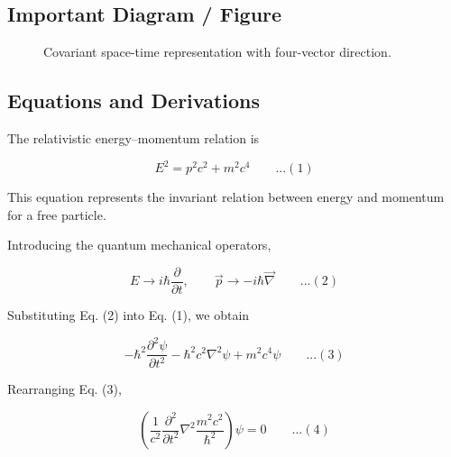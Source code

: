 \documentclass[12pt]{report}
\begin{document}
\subsection*{Important Diagram / Figure}

\begin{figure}[H]
    \centering
    \caption{Covariant space-time representation with four-vector direction.}
\end{figure}

\subsection*{Equations and Derivations}

The relativistic energy--momentum relation is

\begin{equation*}
E^2 = p^2 c^2 + m^2 c^4 \qquad ...(1)
\end{equation*}

This equation represents the invariant relation between energy and momentum for a free particle.

Introducing the quantum mechanical operators,

\begin{equation*}
E \rightarrow i\hbar \frac{\partial}{\partial t},\qquad\vec{p} \rightarrow -i\hbar \vec{\nabla} \qquad ...(2)
\end{equation*}

Substituting Eq. (2) into Eq. (1), we obtain

\begin{equation*}
-\hbar^2 \frac{\partial^2 \psi}{\partial t^2}
-\hbar^2 c^2 \nabla^2 \psi + m^2 c^4 \psi \qquad ...(3)
\end{equation*}

Rearranging Eq. (3),

\begin{equation*}
\left( \frac{1}{c^2}\frac{\partial^2}{\partial t^2}
\nabla^2
\frac{m^2 c^2}{\hbar^2} \right)\psi = 0 \qquad ...(4)
\end{equation*}
\end{document}
